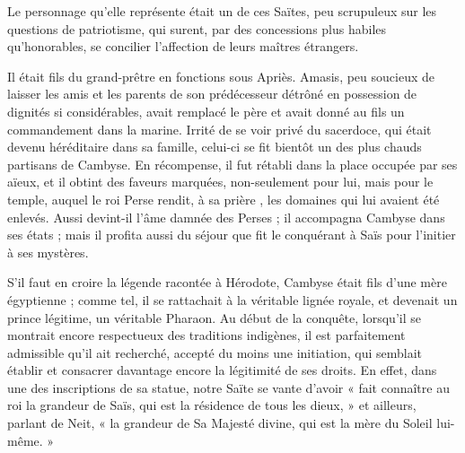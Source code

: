 \documentclass[letterpaper,twocolumn,openany,nodeprecatedcode]{dndbook}
\begin{document}
Le personnage qu'elle représente était un de ces Saïtes, peu scrupuleux sur les questions de patriotisme, qui surent, par des concessions plus habiles qu'honorables, se concilier l'affection de leurs maîtres étrangers.

Il était fils du grand-prêtre en fonctions sous Apriès. Amasis, peu soucieux de laisser les amis et les parents de son prédécesseur détrôné en possession de dignités si considérables, avait remplacé le père et avait donné au fils un commandement dans la marine. Irrité de se voir privé du sacerdoce, qui était devenu héréditaire dans sa famille, celui-ci se fit bientôt un des plus chauds partisans de Cambyse. En récompense, il fut rétabli dans la place occupée par ses aïeux, et il obtint des faveurs marquées, non-seulement pour lui, mais pour le temple, auquel le roi Perse rendit, à sa prière , les domaines qui lui avaient été enlevés. Aussi devint-il l'âme damnée des Perses ; il accompagna Cambyse dans ses états ; mais il profita aussi du séjour que fit le conquérant à Saïs pour l'initier à ses mystères.

S'il faut en croire la légende racontée à Hérodote, Cambyse était fils d'une mère égyptienne ; comme tel, il se rattachait à la véritable lignée royale, et devenait un prince légitime, un véritable Pharaon. Au début de la conquête, lorsqu'il se montrait encore respectueux des traditions indigènes, il est parfaitement admissible qu'il ait recherché, accepté du moins une initiation, qui semblait établir et consacrer davantage encore la légitimité de ses droits. En effet, dans une des inscriptions de sa statue, notre Saïte se vante d'avoir « fait connaître au roi la grandeur de Saïs, qui est la résidence de tous les dieux, » et ailleurs, parlant de Neit, « la grandeur de Sa Majesté divine, qui est la mère du Soleil lui-même. »
\end{document}
